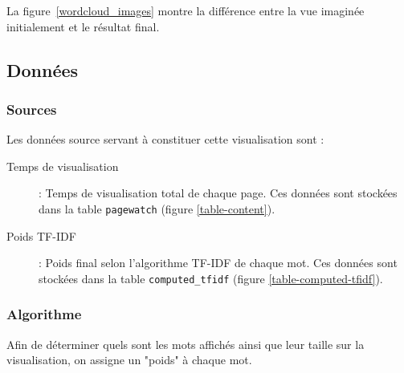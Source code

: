 		La figure~\ref{wordcloud_images} montre la différence entre la vue imaginée initialement et le résultat final.

	\subsection{Données}

		\subsubsection{Sources}

			Les données source servant à constituer cette visualisation sont :
			\begin{description}
				\item[Temps de visualisation] : Temps de visualisation total de chaque page. Ces données sont stockées dans la table \texttt{pagewatch} (figure \ref{table-content}).
				\item[Poids TF-IDF] : Poids final selon l'algorithme TF-IDF de chaque mot. Ces données sont stockées dans la table \texttt{computed\_tfidf} (figure \ref{table-computed-tfidf}).
			\end{description}
		\subsubsection{Algorithme}

			Afin de déterminer quels sont les mots affichés ainsi que leur taille sur la visualisation, on assigne un "poids" à chaque mot.


